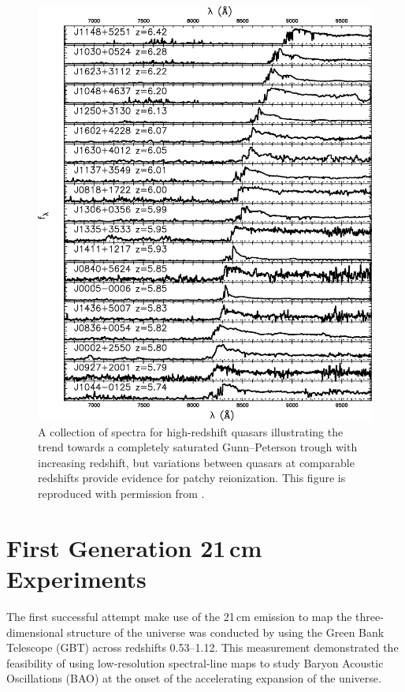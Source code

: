 \begin{bibunit}
\begin{figure}[p]
    \centering
    \includegraphics[width=\textwidth]{figures/chapter1/fan-quasar-spectra}
    \caption{
        A collection of spectra for high-redshift quasars illustrating the trend towards a
        completely saturated Gunn--Peterson trough with increasing redshift, but variations between
        quasars at comparable redshifts provide evidence for patchy reionization. This figure is
        reproduced with permission from \citet{2006AJ....132..117F}.
    }
    \label{fig:fan-quasars}
\end{figure}

\section{First Generation 21\,cm Experiments}

The first successful attempt make use of the 21\,cm emission to map the three-dimensional structure
of the universe was conducted by \citet{2010Natur.466..463C} using the Green Bank Telescope (GBT)
across redshifts 0.53--1.12. This measurement demonstrated the feasibility of using low-resolution
spectral-line maps to study Baryon Acoustic Oscillations (BAO) at the onset of the accelerating
expansion of the universe.


\end{bibunit}
